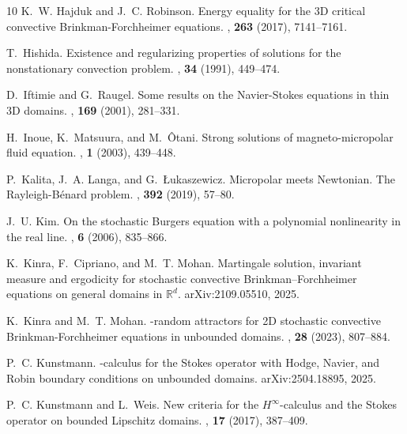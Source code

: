 \documentclass[11pt, reqno]{amsart}
\theoremstyle{definition}
\numberwithin{equation}{section}
\begin{document}
\begin{thebibliography}{10}
	K.~W. Hajduk and J.~C. Robinson.
	\newblock Energy equality for the 3{D} critical convective
	{B}rinkman-{F}orchheimer equations.
	,  {\bf 263} (2017), 7141--7161.
	
	T.~Hishida.
	\newblock Existence and regularizing properties of solutions for the
	nonstationary convection problem.
	,  {\bf 34} (1991), 449--474.
	
	D.~Iftimie and G.~Raugel.
	\newblock Some results on the {N}avier-{S}tokes equations in thin 3{D} domains.
	,  {\bf 169} (2001), 281--331.
	
	H.~Inoue, K.~Matsuura, and M.~\^Otani.
	\newblock Strong solutions of magneto-micropolar fluid equation.
	,  {\bf 1} (2003), 439--448.
	
	P.~Kalita, J.~A. Langa, and G.~{\L}ukaszewicz.
	\newblock Micropolar meets {N}ewtonian. {T}he {R}ayleigh-{B}\'enard problem.
	,  {\bf 392} (2019), 57--80.
	
	J.~U. Kim.
	\newblock On the stochastic {B}urgers equation with a polynomial nonlinearity
	in the real line.
	,  {\bf 6} (2006), 835--866.
	
	K.~Kinra, F.~Cipriano, and M.~T. Mohan.
	\newblock Martingale solution, invariant measure and ergodicity for stochastic
	convective {B}rinkman--{F}orchheimer equations on general domains in
	{$\mathbb{R}^d$}.
	\newblock arXiv:2109.05510, 2025.
	
	K.~Kinra and M.~T. Mohan.
	-random attractors for 2{D} stochastic convective
	{B}rinkman-{F}orchheimer equations in unbounded domains.
	,  {\bf 28} (2023), 807--884.
	
	P.~C. Kunstmann.
	-calculus for the {S}tokes operator with {H}odge,
	{N}avier, and {R}obin boundary conditions on unbounded domains.
	\newblock arXiv:2504.18895, 2025.
	
	P.~C. Kunstmann and L.~Weis.
	\newblock New criteria for the {$H^\infty$}-calculus and the {S}tokes operator
	on bounded {L}ipschitz domains.
	,  {\bf 17} (2017), 387--409.
	

\end{thebibliography}
\end{document}
